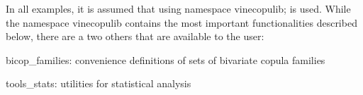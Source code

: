 In all examples, it is assumed that {\ttfamily using namespace vinecopulib;} is used. While the namespace {\ttfamily vinecopulib} contains the most important functionalities described below, there are a two others that are available to the user\+:
\begin{DoxyItemize}
\item {\ttfamily bicop\+\_\+families}\+: convenience definitions of sets of bivariate copula families
\item {\ttfamily tools\+\_\+stats}\+: utilities for statistical analysis 
\end{DoxyItemize}